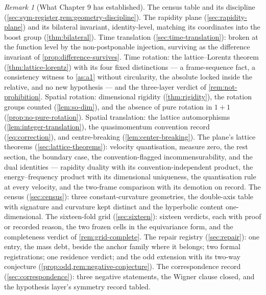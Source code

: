 \documentclass[11pt]{amsbook}
\theoremstyle{plain}
\theoremstyle{definition}
\theoremstyle{remark}
\newtheorem{remark}[theorem]{Remark}
\begin{document}
\begin{remark}[What Chapter 9 has established]\label{rem:ch9summary}
The census table and its discipline (\cref{sec:sym-register,rem:geometry-discipline}). The rapidity plane (\cref{sec:rapidity-plane}) and its bilateral invariant, identity-level, matching its coordinates into the boost group (\cref{thm:bilateral}). Time translation (\cref{sec:time-translation}): broken at the function level by the non-postponable injection, surviving as the difference invariant of \cref{prop:difference-survives}. Time rotation: the lattice--Lorentz theorem (\cref{thm:lattice-lorentz}) with its four fixed distinctions --- a frame-sequence fact, a consistency witness to \cref{as:a1} without circularity, the absolute locked inside the relative, and no new hypothesis --- and the three-layer verdict of \cref{rem:not-prohibition}. Spatial rotation: dimensional rigidity (\cref{thm:rigidity}), the rotation groups counted (\cref{lem:so-dim}), and the absence of pure rotation in $1{+}1$ (\cref{prop:no-pure-rotation}). Spatial translation: the lattice automorphisms (\cref{lem:integer-translation}), the quasimomentum convention record (\cref{eq:correction}), and centre-breaking (\cref{lem:center-breaking}). The plane's lattice theorems (\cref{sec:lattice-theorems}): velocity quantisation, measure zero, the rest section, the boundary case, the convention-flagged incommensurability, and the dual identities --- rapidity duality with its convention-independent product, the energy--frequency product with its dimensional uniqueness, the quantisation rule at every velocity, and the two-frame comparison with its demotion on record. The census (\cref{sec:census}): three constant-curvature geometries, the double-axis table with signature and curvature kept distinct and the hyperbolic content one-dimensional. The sixteen-fold grid (\cref{sec:sixteen}): sixteen verdicts, each with proof or recorded reason, the two frozen cells in the equivariance form, and the completeness verdict of \cref{rem:grid-complete}. The repair registry (\cref{sec:repair}): one entry, the mass debt, beside the anchor family where it belongs; two formal registrations; one residence verdict; and the odd extension with its two-way conjecture (\cref{prop:odd,rem:negative-conjecture}). The correspondence record (\cref{sec:correspondence}): three negative statements, the Wigner clause closed, and the hypothesis layer's symmetry record tabled.


\end{remark}
\end{document}
